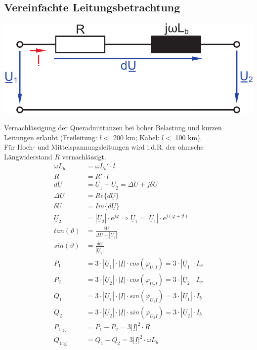 \documentclass[a4paper,twocolumn,10pt]{article}
\begin{document}
\subsection{Vereinfachte Leitungsbetrachtung}
\begin{center}
\includegraphics[width=0.8\columnwidth]{Grafiken/Uebertragungsleitung}
\end{center}
Vernachlässigung der Queradmittanzen bei hoher Belastung und kurzen Leitungen erlaubt (Freileitung: $l<$ 200 km; Kabel: $l<$ 100 km).\\
Für Hoch- und Mittelspannungsleitungen wird i.d.R. der ohmsche Längwiderstand $R$ vernachlässigt.
\begin{equation*}
\begin{split}
\omega L_b&=\omega L_b'\cdot l\\
R&=R'\cdot l\\
d\underline{U}&=\underline{U}_1-\underline{U}_2=\Delta U+j\delta U\\
\Delta U&=Re\{d\underline{U}\}\\
\delta U&=Im\{d\underline{U}\}\\
\underline{U}_2&=|\underline{U}_2|\cdot e^{j\varphi}\Rightarrow \underline{U}_1=|\underline{U}_1|\cdot e^{j(\varphi+\vartheta)}\\
tan(\vartheta)&=\frac{\delta U}{\Delta U+|\underline{U}_2|}\\
sin(\vartheta)&=\frac{\delta U}{|\underline{U}_1|}\\
P_1&=3\cdot|\underline{U}_1|\cdot |\underline{I}|\cdot cos(\varphi_{U_1I})=3\cdot |\underline{U}_1|\cdot I_w\\
P_2&=3\cdot|\underline{U}_2|\cdot |\underline{I}|\cdot cos(\varphi_{U_2I})=3\cdot |\underline{U}_2|\cdot I_w\\
Q_1&=3\cdot|\underline{U}_1|\cdot |\underline{I}|\cdot sin(\varphi_{U_1I})=3\cdot |\underline{U}_1|\cdot I_b\\
Q_2&=3\cdot|\underline{U}_2|\cdot |\underline{I}|\cdot sin(\varphi_{U_2I})=3\cdot |\underline{U}_2|\cdot I_b\\
P_{\text{Ltg}}&=P_1-P_2=3|\underline{I}|^2\cdot R\\
Q_{\text{Ltg}}&=Q_1-Q_2=3|\underline{I}|^2\cdot \omega L_b
\end{split}
\end{equation*}
\end{document}
